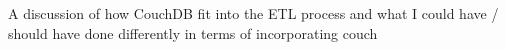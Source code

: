 A discussion of how CouchDB fit into the ETL process and what I could have / should have done differently in terms of incorporating couch